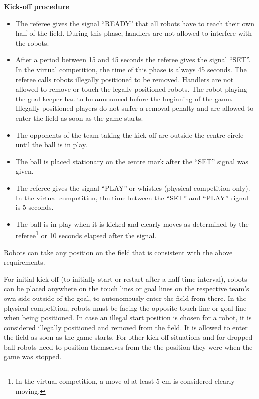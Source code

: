 \bigskip
 
{\bfseries Kick-off procedure}

\begin{itemize}
\item The referee gives the signal ``READY'' that all robots have to reach their
      own half of the field.
      During this phase, handlers are not allowed to interfere with the
      robots.
\item After a period between 15 and 45 seconds the referee gives the signal ``SET''. In the virtual competition, the time of this phase is always 45 seconds.
      The referee calls robots illegally positioned to be removed.
      Handlers are not allowed to remove or touch the legally positioned robots.
      The robot playing the goal keeper has to be announced before the beginning
      of the game.
      Illegally positioned players do not suffer a removal penalty and are
      allowed to enter the field as soon as the game starts.
\item The opponents of the team taking the kick-off are outside the centre circle until the ball is in play.
\item The ball is placed stationary on the centre mark after the ``SET'' signal was given.
\item The referee gives the signal ``PLAY'' or whistles (physical competition only). In the virtual competition, the time between the ``SET'' and ``PLAY'' signal is 5 seconds.
\item The ball is in play when it is kicked and clearly moves as determined by
      the referee\footnote{In the virtual competition, a move of at least 5 cm is considered clearly moving.} or 10 seconds elapsed after the signal.
\end{itemize}

Robots can take any position on the field that is consistent with the above requirements.


\bigskip
 
For initial kick-off (to initially start or restart after a half-time interval),
robots can be placed anywhere on the touch lines or goal lines on the respective
team's own side outside of the goal,
to autonomously enter the field from there.
In the physical competition, robots must be facing the opposite touch line or goal line when being positioned.
In case an illegal start position is chosen for a robot, it is considered illegally positioned and removed from the field. It is allowed to enter the field as soon as the game starts.
For other kick-off situations and for dropped ball robots need to
position themselves from the the position they were when the game was stopped.


